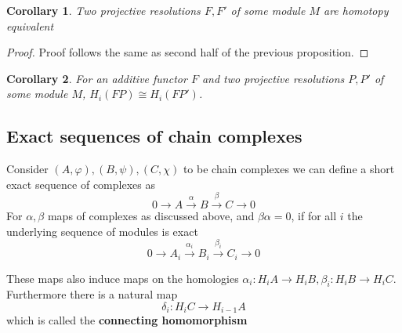 \documentclass[12pt]{article}
\numberwithin{equation}{section}
\newtheorem{corollary}{Corollary}[theorem]
\begin{document}
	\begin{corollary}
		Two projective resolutions $F, F'$ of some module $M$ are homotopy equivalent 
	\end{corollary}
	\begin{proof}
		Proof follows the same as second half of the previous proposition.
	\end{proof}
	\begin{corollary}
		For an additive functor $F$ and two projective resolutions $P, P'$ of some module $M$, $H_i(FP) \cong H_i(FP')$.
	\end{corollary}
	
	\subsection{Exact sequences of chain complexes}
	Consider $(A,\varphi),(B,\psi),(C,\chi)$ to be chain complexes we can define a short exact sequence of complexes as \[ 0 \to A \xrightarrow{\alpha} B \xrightarrow{\beta} C \to 0 \]
	For $\alpha, \beta $ maps of complexes as discussed above, and $\beta \alpha=0$, if for all $i$ the underlying sequence of modules is exact\[ 0 \to A_i \xrightarrow{\alpha_i } B_i \xrightarrow{\beta_i } C_i \to 0\]
	
	These maps also induce maps on the homologies $\alpha_i: H_i A \to H_i B, \beta_i: H_i B \to H_i C$. Furthermore there is a natural map \[ 	\delta_i : H_i C \to H_{i-1}A	 \] which is called the \textbf{connecting homomorphism}
	
\end{document}
